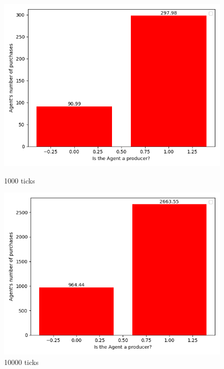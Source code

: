 {{{{{{{{{{{{{        \begin{figure}[H]
                \includegraphics[width=\linewidth]{img/exp/13_1.png}
                \caption{1000 ticks}
            \endminipage\hfill
                \includegraphics[width=\linewidth]{img/exp/13_2.png}
                \caption{10000 ticks}
            \endminipage\hfill
        \end{figure}

}}}}}}}}}}}}}
